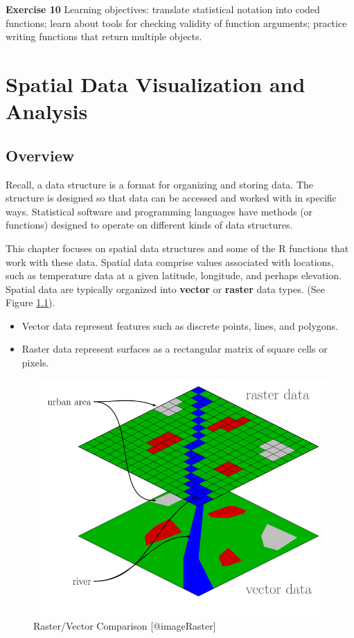 \documentclass[]{krantz}
\providecommand{\tightlist}{%
  \setlength{\itemsep}{0pt}\setlength{\parskip}{0pt}}
\begin{document}
\textbf{Exercise 10} Learning objectives: translate statistical notation into coded functions; learn about tools for checking validity of function arguments; practice writing functions that return multiple objects.

\hypertarget{sp}{%
\chapter{Spatial Data Visualization and Analysis}\label{sp}}

\hypertarget{overview}{%
\section{Overview}\label{overview}}

Recall, a data structure is a format for organizing and storing data. The structure is designed so that data can be accessed and worked with in specific ways. Statistical software and programming languages have methods (or functions) designed to operate on different kinds of data structures.

This chapter focuses on spatial data structures and some of the R functions that work with these data. Spatial data comprise values associated with locations, such as temperature data at a given latitude, longitude, and perhaps elevation. Spatial data are typically organized into \textbf{vector} or \textbf{raster} data types. (See Figure \ref{fig:raster}).

\begin{itemize}
\tightlist
\item
  Vector data represent features such as discrete points, lines, and polygons.
\item
  Raster data represent surfaces as a rectangular matrix of square cells or pixels.
\end{itemize}

\begin{figure}

{\centering \includegraphics[width=1\linewidth]{../figures/Raster_vector_tikz} 

}

\caption{Raster/Vector Comparison [@imageRaster]}\label{fig:raster}
\end{figure}
\end{document}
